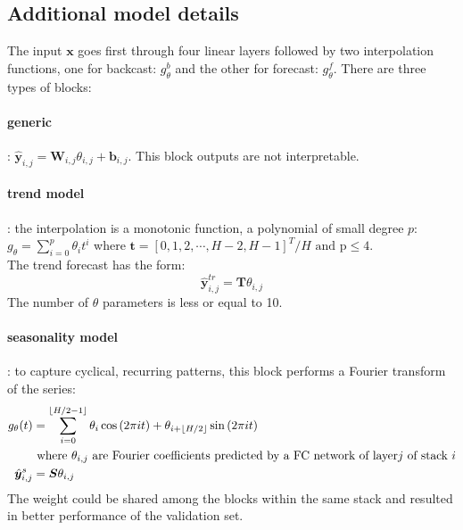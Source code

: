 \documentclass{article}
\DeclarePairedDelimiter\floor{\lfloor}{\rfloor}
\newcommand{\vect}[1]{\bm{#1}} %
\newcommand{\matr}[1]{\bm{#1}} %
\begin{document}
\subsection{Additional model details}
The input $\vect{x}$ goes first through four linear layers followed by two interpolation functions, one for backcast: $g_\theta^b$ and the other for forecast: $g_\theta^f$.
There are three types of blocks:
\paragraph{generic}: $\hat{\vect{y}}_{i,j} = \matr{W}_{i,j} \theta_{i,j} + \vect{b}_{i,j}$. This block outputs are not interpretable.
\paragraph{trend model}: the interpolation is a monotonic function, a polynomial of small degree $p$: \\
$g_\theta = \sum_{i=0}^p \theta_i t^i$ where $\vect{t} = [0,1,2,\cdots,H-2, H-1]^T/H \text{ and p} \le 4$. \\
The trend forecast has the form: 
\[
	\hat{\vect{y}}_{i,j}^{tr} = \matr{T} \theta_{i,j}
\]
The number of  $\theta$ parameters is less or equal to 10.
\paragraph{seasonality model}: to capture cyclical, recurring patterns, this block performs a Fourier transform of the series: 
\begin{align*}
		g_\theta (t)		&= \sum_{i=0}^{\floor*{H/2-1}} \theta_i \cos{(2 \pi it)} + \theta_{i + \floor*{H/2}}  \sin{(2 \pi it)} \\
						&	\text{ where } \theta_{i,j} \text{ are Fourier coefficients predicted by a FC network of layer} j \text{ of stack } i \\
		\hat{\vect{y}}_{i,j}^{s} &= \matr{S} \theta_{i,j}		
\end{align*}
The weight could be shared among the blocks within the same stack and resulted in better performance of the validation set.
\end{document}
